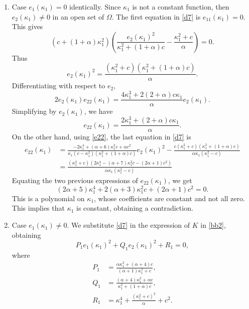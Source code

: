\documentclass{birkjour}
\theoremstyle{definition}
\theoremstyle{remark}
\numberwithin{equation}{section}
\begin{document}
\begin{enumerate}
\item Case  $e_1(\kappa_1)=0$ identically. Since $\kappa_1$ is not a constant function, then  $e_2(\kappa_1)\not=0$   in an open set of $\Omega$.     The first equation in \eqref{d7} is $e_{11}(\kappa_1)=0$. This gives 
$$\left(c+(1+\alpha)  \kappa_1^2\right) \left(\frac{e_2(\kappa_1)^2}{\kappa_1^2+(1+\alpha)c}-\frac{\kappa_1^2+c}{\alpha }\right)=0.$$
Thus
\begin{equation}\label{e22}
e_2(\kappa_1)^2=\frac{(\kappa_1^2+c)(\kappa_1^2+(1+\alpha)c)}{\alpha}.
\end{equation}
Differentiating with respect to $e_2$, 
$$2e_2(\kappa_1)e_{22}(\kappa_1)=\frac{4\kappa_1^3+2(2+\alpha)c\kappa_1}{\alpha}e_2(\kappa_1).$$
Simplifying by $e_2(\kappa_1)$, we have 
$$e_{22}(\kappa_1)=\frac{2\kappa_1^3+(2+\alpha)c\kappa_1}{\alpha}.$$
On the other hand, using \eqref{e22},  the last equation in \eqref{d7}  is
\begin{equation*}
\begin{split}
e_{22}(\kappa_1)&=\frac{-2 \kappa_1^4+(\alpha +6) \kappa_1^2 c+\alpha  c^2}{\kappa_1 \left(c-\kappa_1^2\right) \left(\kappa_1^2+(1+\alpha)c\right)}e_2(\kappa_1)^2-\frac{c \left(\kappa_1^2+c\right) \left(\kappa_1^2+(1+\alpha)c\right)}{\alpha  \kappa_1 \left(\kappa_1^2-c\right)}\\
&=\frac{\left(\kappa_1^2+c\right) \left(2 \kappa_1^4-(\alpha +7) \kappa_1^2 c-(2 \alpha +1) c^2\right)}{\alpha  \kappa_1 \left(\kappa_1^2-c\right)}
\end{split}
\end{equation*}
  Equating the two previous  expressions of $e_{22}(\kappa_1)$, we get 
  $$ (2 \alpha +5) \kappa_1^4+2 (\alpha +3) \kappa_1^2 c+(2 \alpha +1) c^2  =0.$$
   This is a polynomial on $\kappa_1$, whose coefficients are constant and not all zero.  This implies that $\kappa_1$ is constant, obtaining a contradiction.
 \item Case $e_1(\kappa_1)\not=0$.
 We substitute \eqref{d7} in the expression of $K$ in \eqref{bb2}, obtaining
\begin{equation}\label{pe1}
P_1e_1(\kappa_1)^2+Q_1e_2(\kappa_1)^2+R_1=0,
\end{equation}
where
\begin{equation*}
\begin{split}
P_1&=\frac{\alpha  \kappa_1^2+(\alpha +4) c}{(\alpha +1) \kappa_1^2+c},\\
Q_1&= \frac{(\alpha +4) \kappa_1^2+\alpha  c}{\kappa_1^2+(1+\alpha)c},\\
R_1&= \kappa_1^4+\frac{\left(\kappa_1^2+c\right)^2}{\alpha }+c^2.
\end{split}
\end{equation*}



\end{enumerate}
\end{document}
